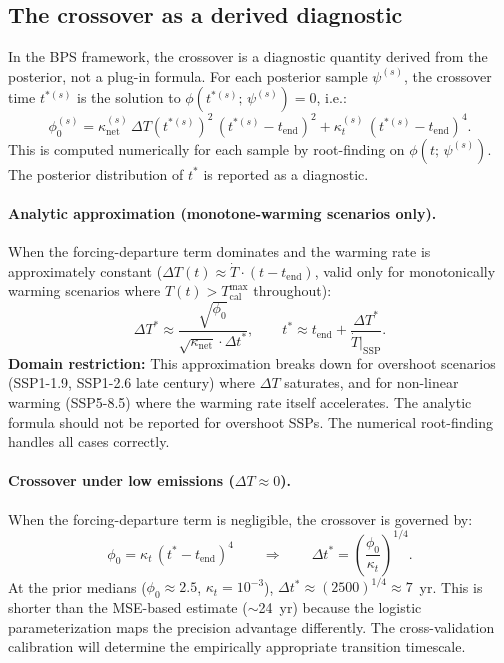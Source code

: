 \documentclass[11pt]{article}
\newcommand{\dT}{\Delta T}
\newcommand{\dTstar}{\Delta T^{*}}
\newcommand{\tcal}{T_{\mathrm{cal}}^{\max}}
\newcommand{\tend}{t_{\mathrm{end}}}
\begin{document}
\subsection{The crossover as a derived diagnostic}
\label{sec:crossover}

In the BPS framework, the crossover is a diagnostic quantity derived from the posterior, not a plug-in formula.  For each posterior sample $\psi^{(s)}$, the crossover time $t^{*(s)}$ is the solution to $\phi(t^{*(s)};\,\psi^{(s)}) = 0$, i.e.:
\begin{equation}
  \phi_0^{(s)} = \kappa_{\mathrm{net}}^{(s)}\,\dT(t^{*(s)})^2\,(t^{*(s)} - \tend)^2 + \kappa_t^{(s)}\,(t^{*(s)} - \tend)^4.
  \label{eq:crossover_numerical}
\end{equation}
This is computed numerically for each sample by root-finding on $\phi(t;\,\psi^{(s)})$.  The posterior distribution of $t^*$ is reported as a diagnostic.

\paragraph{Analytic approximation (monotone-warming scenarios only).}  When the forcing-departure term dominates and the warming rate is approximately constant ($\dT(t) \approx \dot{T} \cdot (t - \tend)$, valid only for monotonically warming scenarios where $T(t) > \tcal$ throughout):
\begin{equation}
  \dTstar \approx \frac{\sqrt{\phi_0}}{\sqrt{\kappa_{\mathrm{net}}} \cdot \Delta t^*}, \qquad t^* \approx \tend + \frac{\dTstar}{\dot{T}\big|_{\mathrm{SSP}}}.
  \label{eq:DT_crossover_analytic}
\end{equation}
\textbf{Domain restriction:} This approximation breaks down for overshoot scenarios (SSP1-1.9, SSP1-2.6 late century) where $\dT$ saturates, and for non-linear warming (SSP5-8.5) where the warming rate itself accelerates.  The analytic formula should not be reported for overshoot SSPs.  The numerical root-finding handles all cases correctly.

\paragraph{Crossover under low emissions ($\dT \approx 0$).}  When the forcing-departure term is negligible, the crossover is governed by:
\begin{equation}
  \phi_0 = \kappa_t\,(t^* - \tend)^4 \qquad\Longrightarrow\qquad \Delta t^* = \left(\frac{\phi_0}{\kappa_t}\right)^{1/4}.
  \label{eq:crossover_lowemissions}
\end{equation}
At the prior medians ($\phi_0 \approx 2.5$, $\kappa_t = 10^{-3}$), $\Delta t^* \approx (2500)^{1/4} \approx 7$~yr.  This is shorter than the MSE-based estimate ($\sim$24~yr) because the logistic parameterization maps the precision advantage differently.  The cross-validation calibration will determine the empirically appropriate transition timescale.
\end{document}
